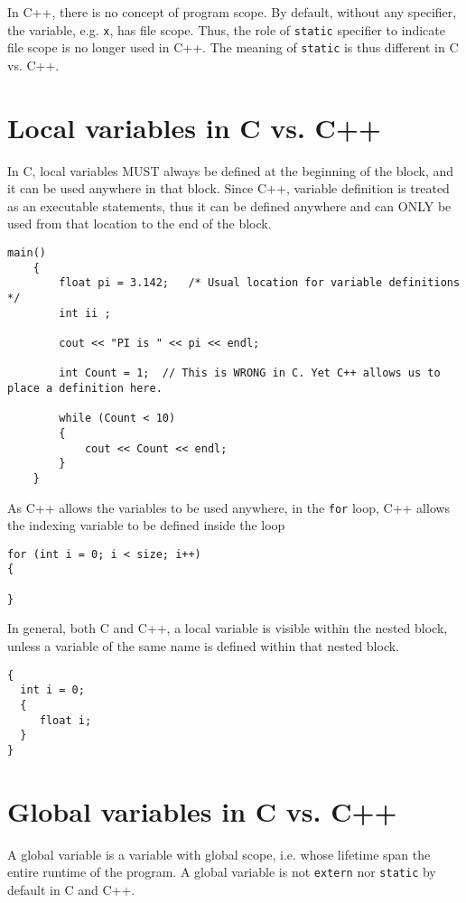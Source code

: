 In C++, there is no concept of program scope.
By default, without any specifier, the variable, e.g. \verb!x!,
has file scope. Thus, the role of \verb!static! specifier to indicate file scope
is no longer used in C++. The meaning of \verb!static! is thus different in C
vs. C++.




\section{Local variables in C vs. C++}
\label{sec:variables_C_C++}

In C, local variables MUST always be defined at the beginning of the block, and
it can be used anywhere in that block. Since C++, variable definition is treated
as an executable statements, thus it can be defined anywhere and can ONLY be
used from that location to the end of the block.

\begin{verbatim}
main()
    {
        float pi = 3.142;   /* Usual location for variable definitions  */
        int ii ;
        
        cout << "PI is " << pi << endl;
        
        int Count = 1;  // This is WRONG in C. Yet C++ allows us to place a definition here.
        
        while (Count < 10)
        {
            cout << Count << endl;
        }
    }
\end{verbatim}

As C++ allows the variables to be used anywhere, in the \verb!for! loop, C++
allows the indexing variable to be defined inside the loop
\begin{verbatim}
for (int i = 0; i < size; i++)
{ 

}
\end{verbatim}

In general, both C and C++, a local variable is visible within the nested block,
unless a variable of the same name is defined within that nested block.
\begin{verbatim}
{
  int i = 0;
  {
     float i;
  }
}
\end{verbatim}


\section{Global variables in C vs. C++}
\label{sec:variable_global}

A global variable is a variable with global scope, i.e. whose lifetime span the
entire runtime of the program. A global variable is not \verb!extern! nor
\verb!static! by default in C and C++.

